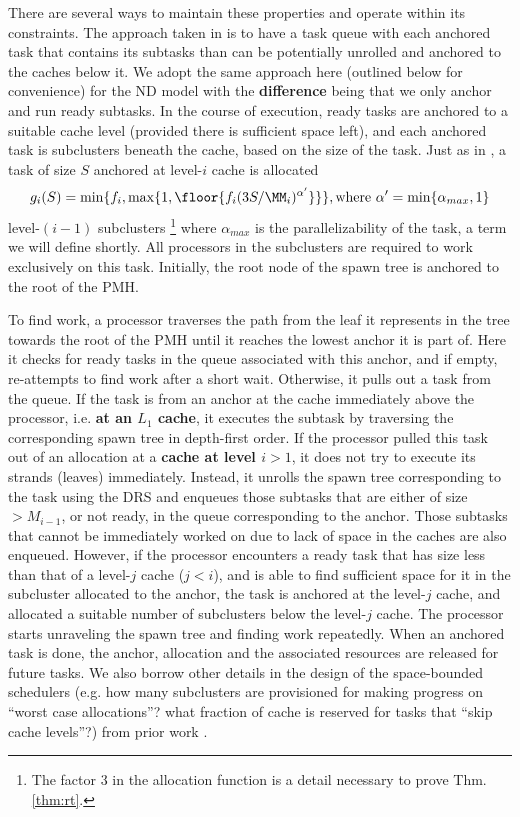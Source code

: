 There are several ways to maintain these properties and operate within
its constraints. The approach taken in \cite{BlellochFiGi11} is to
have a task queue with each anchored task that contains its subtasks
than can be potentially unrolled and anchored to the caches below it.
We adopt the same approach here (outlined below for convenience) for
the ND model with the \textbf{difference} being that we only anchor
and run ready subtasks. In the course of execution, ready tasks are
anchored to a suitable cache level (provided there is sufficient space
left), and each anchored task is  subclusters beneath
the cache, based on the size of the task. Just as
in \cite{BlellochFiGi11}, a task of size $S$ anchored at level-$i$
cache is allocated
\[
g_i(S) = \min\{f_i,                                         
\max\{1,\floor{f_i(3S/\MM_i)^{\alpha'}}\} \}, \textrm{where}\  
\alpha' = \min\{\alpha_{max},1\}
\] 
level-$(i-1)$ subclusters \footnote{The factor 3 in the allocation
function is a detail necessary to prove Thm.\ref{thm:rt}.}
where $\alpha_{max}$ is the parallelizability
of the task, a term we will define shortly. All processors in the
subclusters are required to work exclusively on this task.  Initially, 
the root node of the spawn tree is anchored to the root of the PMH.

To find work, a processor traverses the path from the leaf it
represents in the tree towards the root of the PMH until it reaches
the lowest anchor it is part of. Here it checks for ready tasks in the
queue associated with this anchor, and if empty, re-attempts to find
work after a short wait.  Otherwise, it pulls out a task from the
queue.  If the task is from an anchor at the cache immediately above
the processor, i.e. {\bf at an $L_1$ cache}, it executes the subtask
by traversing the corresponding spawn tree in depth-first order.  If
the processor pulled this task out of an allocation at a {\bf cache at
level $i>1$}, it does not try to execute its strands (leaves)
immediately. Instead, it unrolls the spawn tree corresponding to the
task using the DRS and enqueues those subtasks that are either of size
$>M_{i-1}$, or not ready, in the queue corresponding to the
anchor. Those subtasks that cannot be immediately worked on due to
lack of space in the caches are also enqueued. However, if the
processor encounters a ready task that has size less than that of a
level-$j$ cache ($j<i$), and is able to find sufficient space for it
in the subcluster allocated to the anchor, the task is anchored at the
level-$j$ cache, and allocated a suitable number of subclusters below
the level-$j$ cache.  The processor starts unraveling the spawn tree
and finding work repeatedly.  When an anchored task is done, the
anchor, allocation and the associated resources are released for
future tasks. We also borrow other details in the design of the
space-bounded schedulers (e.g. how many subclusters are provisioned
for making progress on ``worst case allocations''? what fraction of
cache is reserved for tasks that ``skip cache levels''?)  from prior
work \cite{BlellochFiGi11}.

